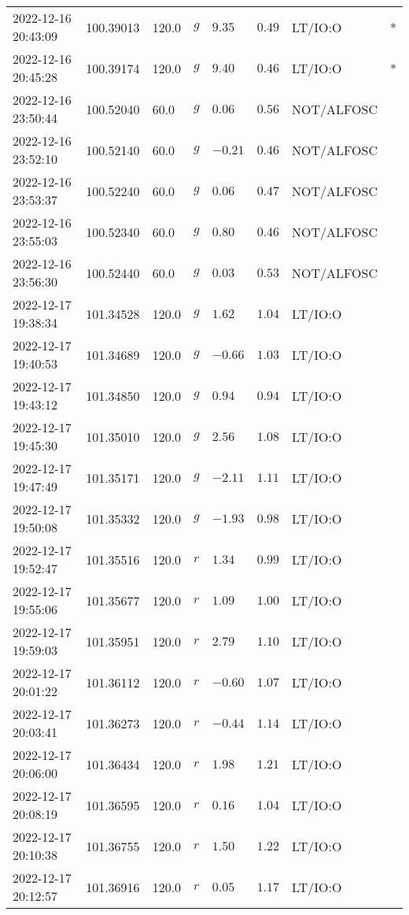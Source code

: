 \documentclass{nature_plusfigure}
\begin{document}
\begin{supplement}
\begin{center}
\begin{longtable}{llllllll}
2022-12-16 20:43:09 & 100.39013 & 120.0 & $g$ & $9.35$ & $0.49$ & LT/IO:O & * \\ 
2022-12-16 20:45:28 & 100.39174 & 120.0 & $g$ & $9.40$ & $0.46$ & LT/IO:O & * \\ 
2022-12-16 23:50:44 & 100.52040 & 60.0 & $g$ & $0.06$ & $0.56$ & NOT/ALFOSC &  \\ 
2022-12-16 23:52:10 & 100.52140 & 60.0 & $g$ & $-0.21$ & $0.46$ & NOT/ALFOSC &  \\ 
2022-12-16 23:53:37 & 100.52240 & 60.0 & $g$ & $0.06$ & $0.47$ & NOT/ALFOSC &  \\ 
2022-12-16 23:55:03 & 100.52340 & 60.0 & $g$ & $0.80$ & $0.46$ & NOT/ALFOSC &  \\ 
2022-12-16 23:56:30 & 100.52440 & 60.0 & $g$ & $0.03$ & $0.53$ & NOT/ALFOSC &  \\ 
2022-12-17 19:38:34 & 101.34528 & 120.0 & $g$ & $1.62$ & $1.04$ & LT/IO:O &  \\ 
2022-12-17 19:40:53 & 101.34689 & 120.0 & $g$ & $-0.66$ & $1.03$ & LT/IO:O &  \\ 
2022-12-17 19:43:12 & 101.34850 & 120.0 & $g$ & $0.94$ & $0.94$ & LT/IO:O &  \\ 
2022-12-17 19:45:30 & 101.35010 & 120.0 & $g$ & $2.56$ & $1.08$ & LT/IO:O &  \\ 
2022-12-17 19:47:49 & 101.35171 & 120.0 & $g$ & $-2.11$ & $1.11$ & LT/IO:O &  \\ 
2022-12-17 19:50:08 & 101.35332 & 120.0 & $g$ & $-1.93$ & $0.98$ & LT/IO:O &  \\ 
2022-12-17 19:52:47 & 101.35516 & 120.0 & $r$ & $1.34$ & $0.99$ & LT/IO:O &  \\ 
2022-12-17 19:55:06 & 101.35677 & 120.0 & $r$ & $1.09$ & $1.00$ & LT/IO:O &  \\ 
2022-12-17 19:59:03 & 101.35951 & 120.0 & $r$ & $2.79$ & $1.10$ & LT/IO:O &  \\ 
2022-12-17 20:01:22 & 101.36112 & 120.0 & $r$ & $-0.60$ & $1.07$ & LT/IO:O &  \\ 
2022-12-17 20:03:41 & 101.36273 & 120.0 & $r$ & $-0.44$ & $1.14$ & LT/IO:O &  \\ 
2022-12-17 20:06:00 & 101.36434 & 120.0 & $r$ & $1.98$ & $1.21$ & LT/IO:O &  \\ 
2022-12-17 20:08:19 & 101.36595 & 120.0 & $r$ & $0.16$ & $1.04$ & LT/IO:O &  \\ 
2022-12-17 20:10:38 & 101.36755 & 120.0 & $r$ & $1.50$ & $1.22$ & LT/IO:O &  \\ 
2022-12-17 20:12:57 & 101.36916 & 120.0 & $r$ & $0.05$ & $1.17$ & LT/IO:O &  \\ 

\end{longtable}
\end{center}
\end{supplement}
\end{document}
